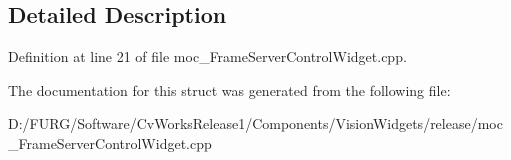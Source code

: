 \subsection{Detailed Description}


Definition at line 21 of file moc\+\_\+\+Frame\+Server\+Control\+Widget.\+cpp.



The documentation for this struct was generated from the following file\+:\begin{DoxyCompactItemize}
\item 
D\+:/\+F\+U\+R\+G/\+Software/\+Cv\+Works\+Release1/\+Components/\+Vision\+Widgets/release/moc\+\_\+\+Frame\+Server\+Control\+Widget.\+cpp\end{DoxyCompactItemize}
